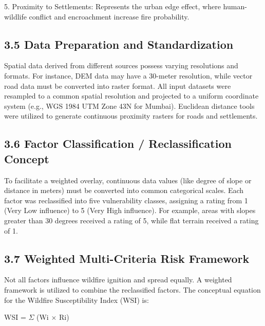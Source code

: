 \documentclass[12pt,a4paper]{article}
\begin{document}
5. Proximity to Settlements: Represents the urban edge effect, where human-wildlife conflict and encroachment increase fire probability.



\subsection*{3.5 Data Preparation and Standardization}

Spatial data derived from different sources possess varying resolutions and formats. For instance, DEM data may have a 30-meter resolution, while vector road data must be converted into raster format. All input datasets were resampled to a common spatial resolution and projected to a uniform coordinate system (e.g., WGS 1984 UTM Zone 43N for Mumbai). Euclidean distance tools were utilized to generate continuous proximity rasters for roads and settlements.



\subsection*{3.6 Factor Classification / Reclassification Concept}

To facilitate a weighted overlay, continuous data values (like degree of slope or distance in meters) must be converted into common categorical scales. Each factor was reclassified into five vulnerability classes, assigning a rating from 1 (Very Low influence) to 5 (Very High influence). For example, areas with slopes greater than 30 degrees received a rating of 5, while flat terrain received a rating of 1.



\subsection*{3.7 Weighted Multi-Criteria Risk Framework}

Not all factors influence wildfire ignition and spread equally. A weighted framework is utilized to combine the reclassified factors. The conceptual equation for the Wildfire Susceptibility Index (WSI) is:


WSI = $\Sigma$ (Wi $\times$ Ri)
\end{document}
